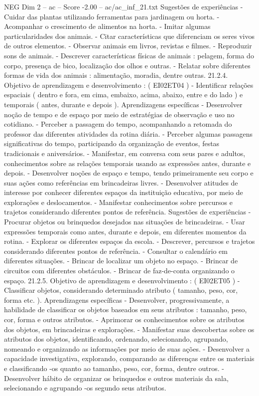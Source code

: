 \begin{textsample}{NEG Dim 2 – ac – Score -2.00 – ac/ac\_inf\_21.txt}
Sugestões de experiências - Cuidar das plantas utilizando ferramentas para jardinagem ou horta. - Acompanhar o crescimento de alimentos na horta. - Imitar algumas particularidades dos animais. - Citar características que diferenciam os seres vivos de outros elementos. - Observar animais em livros, revistas e filmes. - Reproduzir sons de animais. - Descrever características físicas de animais : pelagem, forma do corpo, presença de bico, localização dos olhos e outras. - Relatar sobre diferentes formas de vida dos animais : alimentação, moradia, dentre outras. 21.2.4.
Objetivo de aprendizagem e desenvolvimento : ( EI02ET04 ) - Identificar relações espaciais ( dentro e fora, em cima, embaixo, acima, abaixo, entre e do lado ) e temporais ( antes, durante e depois ).
Aprendizagens específicas - Desenvolver noção de tempo e de espaço por meio de estratégias de observação e uso no cotidiano. - Perceber a passagem do tempo, acompanhando a retomada do professor das diferentes atividades da rotina diária. - Perceber algumas passagens significativas do tempo, participando da organização de eventos, festas tradicionais e aniversários. - Manifestar, em conversa com seus pares e adultos, conhecimentos sobre as relações temporais usando as expressões antes, durante e depois. - Desenvolver noções de espaço e tempo, tendo primeiramente seu corpo e suas ações como referências em brincadeiras livres. - Desenvolver atitudes de interesse por conhecer diferentes espaços da instituição educativa, por meio de explorações e deslocamentos. - Manifestar conhecimentos sobre percursos e trajetos considerando diferentes pontos de referência.
Sugestões de experiências - Procurar objetos ou brinquedos desejados nas situações de brincadeiras. - Usar expressões temporais como antes, durante e depois, em diferentes momentos da rotina. - Explorar os diferentes espaços da escola. - Descrever, percursos e trajetos considerando diferentes pontos de referência. - Consultar o calendário em diferentes situações. - Brincar de localizar um objeto no espaço. - Brincar de circuitos com diferentes obstáculos. - Brincar de faz-de-conta organizando o espaço. 21.2.5.
Objetivo de aprendizagem e desenvolvimento : ( EI02ET05 ) - Classificar objetos, considerando determinado atributo ( tamanho, peso, cor, forma etc. ).
Aprendizagens específicas - Desenvolver, progressivamente, a habilidade de classificar os objetos baseados em seus atributos : tamanho, peso, cor, forma e outros atributos. - Aprimorar os conhecimentos sobre os atributos dos objetos, em brincadeiras e explorações. - Manifestar suas descobertas sobre os atributos dos objetos, identificando, ordenando, selecionando, agrupando, nomeando e organizando as informações por meio de suas ações. - Desenvolver a capacidade investigativa, explorando, comparando as diferenças entre os materiais e classificando -os quanto ao tamanho, peso, cor, forma, dentre outros. - Desenvolver hábito de organizar os brinquedos e outros materiais da sala, selecionando e agrupando -os segundo seus atributos.

\end{textsample}
